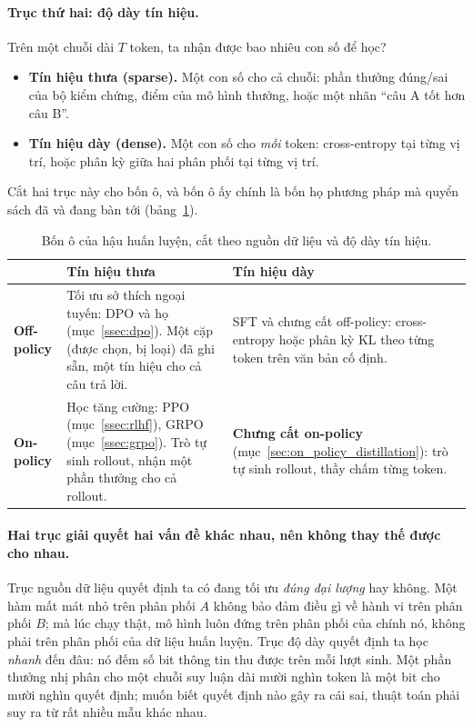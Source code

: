\paragraph{Trục thứ hai: độ dày tín hiệu.} Trên một chuỗi dài $T$ token, ta nhận được bao nhiêu con số để học?
\begin{itemize}
	\item \textbf{Tín hiệu thưa (sparse).} Một con số cho cả chuỗi: phần thưởng đúng/sai của bộ kiểm chứng, điểm của mô hình thưởng, hoặc một nhãn ``câu A tốt hơn câu B''.
	\item \textbf{Tín hiệu dày (dense).} Một con số cho \emph{mỗi} token: cross-entropy tại từng vị trí, hoặc phân kỳ giữa hai phân phối tại từng vị trí.
\end{itemize}

Cắt hai trục này cho bốn ô, và bốn ô ấy chính là bốn họ phương pháp mà quyển sách đã và đang bàn tới (bảng~\ref{tab:post_training_quadrants}).

\begin{table}[H]
\centering\small
\caption{Bốn ô của hậu huấn luyện, cắt theo nguồn dữ liệu và độ dày tín hiệu.}
\label{tab:post_training_quadrants}
\begin{tabularx}{\textwidth}{@{}>{\raggedright\arraybackslash}p{2.3cm}XX@{}}
\toprule
 & \textbf{Tín hiệu thưa} & \textbf{Tín hiệu dày} \\
\midrule
\textbf{Off-policy} & Tối ưu sở thích ngoại tuyến: DPO và họ (mục~\ref{ssec:dpo}). Một cặp (được chọn, bị loại) đã ghi sẵn, một tín hiệu cho cả câu trả lời. & SFT và chưng cất off-policy: cross-entropy hoặc phân kỳ KL theo từng token trên văn bản cố định. \\
\addlinespace
\textbf{On-policy} & Học tăng cường: PPO (mục~\ref{ssec:rlhf}), GRPO (mục~\ref{ssec:grpo}). Trò tự sinh rollout, nhận một phần thưởng cho cả rollout. & \textbf{Chưng cất on-policy} (mục~\ref{sec:on_policy_distillation}): trò tự sinh rollout, thầy chấm từng token. \\
\bottomrule
\end{tabularx}
\end{table}

\paragraph{Hai trục giải quyết hai vấn đề khác nhau, nên không thay thế được cho nhau.} Trục nguồn dữ liệu quyết định ta có đang tối ưu \emph{đúng đại lượng} hay không. Một hàm mất mát nhỏ trên phân phối $A$ không bảo đảm điều gì về hành vi trên phân phối $B$; mà lúc chạy thật, mô hình luôn đứng trên phân phối của chính nó, không phải trên phân phối của dữ liệu huấn luyện. Trục độ dày quyết định ta học \emph{nhanh} đến đâu: nó đếm số bit thông tin thu được trên mỗi lượt sinh. Một phần thưởng nhị phân cho một chuỗi suy luận dài mười nghìn token là một bit cho mười nghìn quyết định; muốn biết quyết định nào gây ra cái sai, thuật toán phải suy ra từ rất nhiều mẫu khác nhau.

